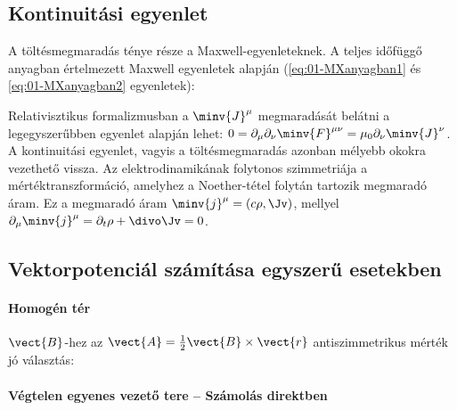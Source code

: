   \subsection{Kontinuitási egyenlet}
   
   A töltésmegmaradás ténye része a Maxwell-egyenleteknek.
   A teljes időfüggő anyagban értelmezett Maxwell egyenletek alapján (\eqref{eq:01-MXanyagban1} és \eqref{eq:01-MXanyagban2} egyenletek):
   
   Relativisztikus formalizmusban a $\minv{J}^\mu$ megmaradását belátni a legegyszerűbben  egyenlet alapján lehet: $0=\partial_\mu\partial_\nu \minv{F}^{\mu\nu}=\mu_0\partial_\nu\minv{J}^{\nu}$.
   A kontinuitási egyenlet, vagyis a töltésmegmaradás azonban mélyebb okokra vezethető vissza.
   Az elektrodinamikának folytonos szimmetriája a mértéktranszformáció, amelyhez a Noether-tétel folytán tartozik megmaradó áram.
   Ez a megmaradó áram $\minv{j}^\mu=(c\rho,\Jv)$, mellyel $\partial_\mu\minv{j}^\mu=\partial_t\rho+\divo\Jv=0$.

  \subsection{Vektorpotenciál számítása egyszerű esetekben}
   
   \paragraph{Homogén tér}
    
    $\vect{B}$-hez az $\vect{A}=\frac{1}{2}\vect{B}\times\vect{r}$ antiszimmetrikus mérték jó választás:
    
   \paragraph{Végtelen egyenes vezető tere -- Számolás direktben}
    
